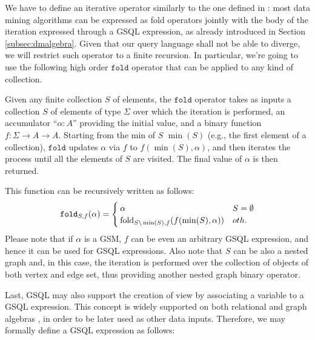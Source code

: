  We have to define an iterative operator similarly to the one defined in \cite{Calders2006,apacheflink}:  most data mining algorithms can be expressed as fold operators jointly with the body of the iteration expressed through a GSQL expression, as already introduced in Section \vref{subsec:dmalgebra}. Given that our query language shall not be able to diverge, we will restrict such operator to a finite recursion. In particular, we're going to use the following  high order $\texttt{fold}$ operator that can be applied to any kind of collection.

\begin{definition}\label{def:fold}
	Given any finite collection $S$ of elements, the $\texttt{fold}$ operator takes as inputs a collection $S$ of elements of type $\Sigma$ over which the iteration is performed, an accumulator ``$\alpha \colon A$'' providing the initial value, and a binary function $f:\Sigma\to A\to A$. Starting from the min of $S$ $\min(S)$ (e.g., the first element of a collection), $\texttt{fold}$ updates $\alpha$ via $f$  to $f(\min(S),\alpha)$, and then iterates the process until all the elements of $S$ are visited. The final value of $\alpha$ is then returned.

	This function can be recursively written as follows:
	\[\texttt{fold}_{S,f}(\alpha)=\begin{cases}
	\alpha & S=\emptyset\\
	\textup{fold}_{S\backslash\min(S),f}(f(\min(S),\alpha)) & oth.
	\end{cases}\]
	Please note that if $\alpha$ is a GSM, $f$ can be even an arbitrary GSQL expression, and hence it can be used for GSQL expressions. Also note that $S$ can be also a nested graph and, in this case, the iteration is performed over the collection of objects of both vertex and edge set, thus providing another nested graph binary operator.
\end{definition}

 Last, GSQL may also support the creation of view by associating a variable to a GSQL expression. This concept is widely supported on both relational \cite{Calders2006,atzeniEN,atzeniIT} and graph algebras \cite{GRAD}, in order to be later used as other data inputs. Therefore, we may formally define a GSQL expression as follows:

